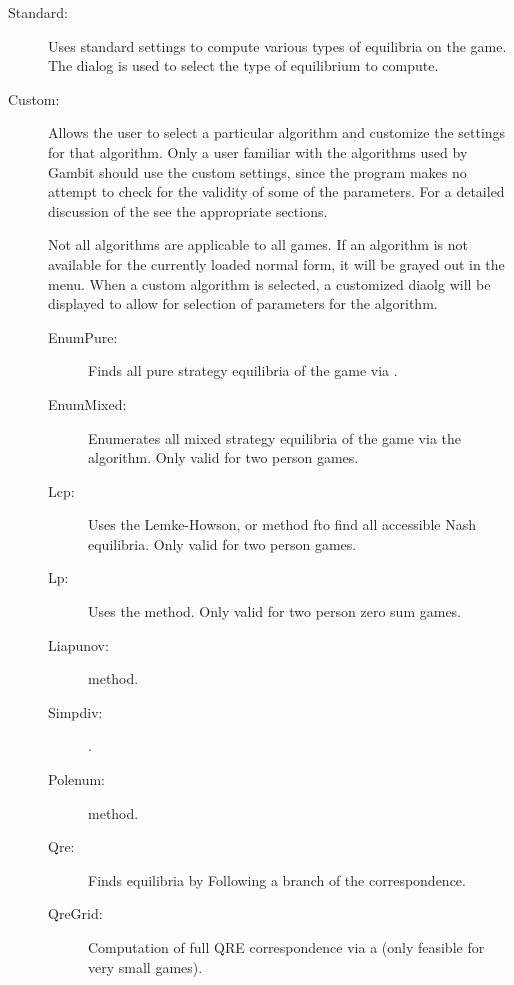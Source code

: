 \documentclass[12pt]{report}
\begin{document}
\begin{description}
\item[Standard:] Uses standard settings to compute various types of
equilibria on the game.  The  dialog is used to select the type of
equilibrium to compute.  
\item[Custom:] Allows the user to select a particular algorithm and
customize the settings for that algorithm.  Only a user familiar with
the algorithms used by Gambit should use the custom settings, since
the program makes no attempt to check for the validity of some of the
parameters.  For a detailed discussion of the 
 see the appropriate sections.

Not all algorithms are applicable to all games.  If an algorithm is
not available for the currently loaded normal form, it will be grayed
out in the menu.  When a custom algorithm is selected, a customized 
 diaolg will be
displayed to allow for selection of parameters for the algorithm.

\begin{description}
\item[EnumPure:] Finds all pure strategy equilibria of the game via 
.
\item[EnumMixed:] Enumerates all mixed strategy equilibria of the
game via the  algorithm. Only valid for two
person games.
\item[Lcp:] Uses the Lemke-Howson, or  method fto find all accessible Nash
equilibria. Only valid for two person games.
\item[Lp:] Uses the  method.  Only
valid for two person zero sum games.
\item[Liapunov:]  method.  
\item[Simpdiv:] . 
\item[Polenum:]  method.  
\item[Qre:] Finds equilibria by Following a branch of the  correspondence.
\item[QreGrid:] Computation of full QRE correspondence via a 
 (only feasible for very small games).
\end{description}
\end{description}
\end{document}
